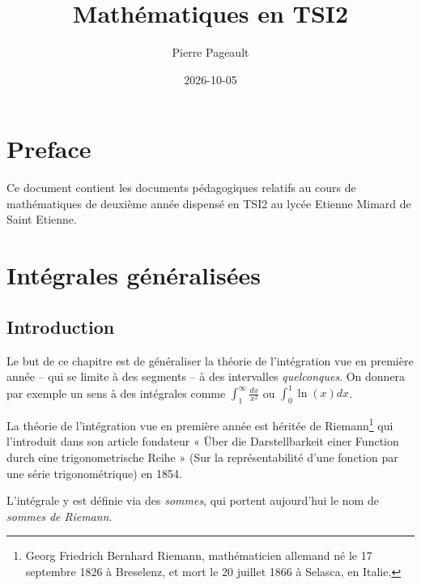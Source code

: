 \documentclass[
  french,
  letterpaper,
  DIV=11,
  numbers=noendperiod]{scrreprt}
\title{Mathématiques en TSI2}
\author{Pierre Pageault}
\date{2026-10-05}
\renewcommand*\contentsname{Table des matières}
\newcommand\contentsname{Table des matières}
\theoremstyle{plain}
\theoremstyle{definition}
\theoremstyle{plain}
\theoremstyle{plain}
\theoremstyle{definition}
\theoremstyle{definition}
\theoremstyle{plain}
\theoremstyle{remark}
\begin{document}
\maketitle

\renewcommand*\contentsname{Table des matières}
{
\setcounter{tocdepth}{2}
\tableofcontents
}


\chapter*{Preface}\label{preface}


Ce document contient les documents pédagogiques relatifs au cours de
mathématiques de deuxième année dispensé en TSI2 au lycée Etienne Mimard
de Saint Etienne.


\chapter{Intégrales
généralisées}\label{intuxe9grales-guxe9nuxe9ralisuxe9es}

\section*{Introduction}\label{introduction}


Le but de ce chapitre est de généraliser la théorie de l'intégration vue
en première année -- qui se limite à des segments -- à des intervalles
\emph{quelconques}. On donnera par exemple un sens à des intégrales
comme \(\displaystyle\int_{1}^{\infty}\frac{dx}{x^{2}}\) ou
\(\displaystyle\int_{0}^{1}\ln(x)dx\).

La théorie de l'intégration vue en première année est héritée de
Riemann\footnote{Georg Friedrich Bernhard Riemann, mathématicien
  allemand né le 17 septembre 1826 à Breselenz, et mort le 20 juillet
  1866 à Selasca, en Italie.} qui l'introduit dans son article fondateur
« Über die Darstellbarkeit einer Function durch eine trigonometrische
Reihe » (Sur la représentabilité d'une fonction par une série
trigonométrique) en 1854.

L'intégrale y est définie via des \emph{sommes}, qui portent aujourd'hui
le nom de \emph{sommes de Riemann}.
\end{document}
